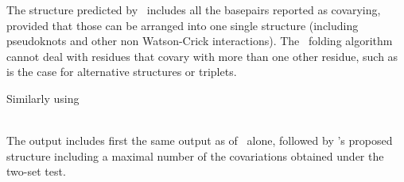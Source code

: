 The structure predicted by \rscape\ includes all the basepairs
reported as covarying, provided that those can be arranged into one
single structure (including pseudoknots and other non Watson-Crick
interactions). The \rscape\ folding algorithm cannot deal with
residues that covary with more than one other residue, such as is the case for
alternative structures or triplets.

\noindent
Similarly using

\\

\noindent
The output includes first the same output as  of
\rscape\ alone, followed by \rscape's proposed structure including a
maximal number of the covariations obtained under the two-set test.


